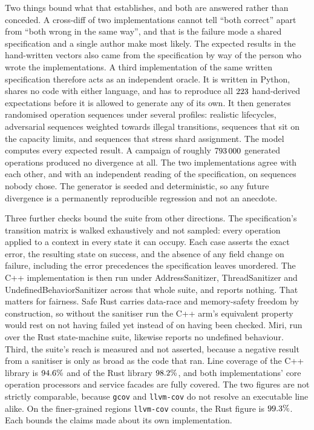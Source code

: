 \documentclass[english,oneside,a4paper,censored,csm,software-track-2020]{HYthesisML}
\begin{document}
Two things bound what that establishes, and both are answered rather than conceded. A
cross-diff of two implementations cannot tell ``both correct'' apart from ``both wrong in the
same way'', and that is the failure mode a shared specification and a single author make most
likely. The expected results in the hand-written vectors also came from the
specification by way of the person who wrote the implementations. A third implementation of the
same written specification therefore acts as an independent oracle. It is written in Python,
shares no code with either language, and has to reproduce all $223$ hand-derived
expectations before it is allowed to generate any of its own. It then generates randomised
operation sequences under several profiles: realistic lifecycles, adversarial sequences
weighted towards illegal transitions, sequences that sit on the capacity limits, and sequences
that stress shard assignment. The model computes every expected result. A campaign
of roughly $793\,000$ generated operations produced no divergence at all. The two
implementations agree with each other, and with an independent reading of the specification, on
sequences nobody chose. The generator is seeded and deterministic, so any future divergence is a
permanently reproducible regression and not an anecdote.

Three further checks bound the suite from other directions. The specification's transition
matrix is walked exhaustively and not sampled: every operation applied to a context in
every state it can occupy. Each case asserts the exact error, the resulting state on success, and
the absence of any field change on failure, including the error precedences the specification
leaves unordered. The C++ implementation is then run under AddressSanitizer, ThreadSanitizer
and UndefinedBehaviorSanitizer across that whole suite, and reports nothing. That matters for
fairness. Safe Rust carries data-race and memory-safety freedom by construction, so without
the sanitiser run the C++ arm's equivalent property would rest on not having failed yet instead
of on having been checked. Miri, run over the Rust state-machine suite, likewise reports no
undefined behaviour. Third, the suite's reach is measured and not asserted, because a
negative result from a sanitiser is only as broad as the code that ran. Line coverage of the
C++ library is $94.6\%$ and of the Rust library $98.2\%$, and both implementations' core
operation processors and service facades are fully covered. The two figures are not strictly
comparable, because \texttt{gcov} and \texttt{llvm-cov} do not resolve an executable line alike.
On the finer-grained regions \texttt{llvm-cov} counts, the Rust figure is $99.3\%$.
Each bounds the claims made about its own implementation.
\end{document}
